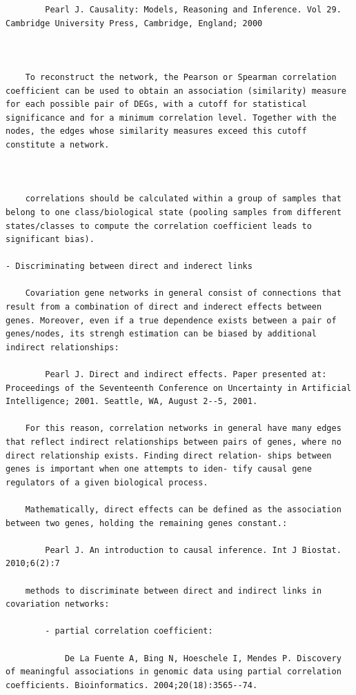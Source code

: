 \documentclass[
]{book}
\begin{document}
\begin{verbatim}
        Pearl J. Causality: Models, Reasoning and Inference. Vol 29. Cambridge University Press, Cambridge, England; 2000



    To reconstruct the network, the Pearson or Spearman correlation coefficient can be used to obtain an association (similarity) measure for each possible pair of DEGs, with a cutoff for statistical significance and for a minimum correlation level. Together with the nodes, the edges whose similarity measures exceed this cutoff constitute a network.



    correlations should be calculated within a group of samples that belong to one class/biological state (pooling samples from different states/classes to compute the correlation coefficient leads to significant bias).

- Discriminating between direct and inderect links

    Covariation gene networks in general consist of connections that result from a combination of direct and inderect effects between genes. Moreover, even if a true dependence exists between a pair of genes/nodes, its strengh estimation can be biased by additional indirect relationships:

        Pearl J. Direct and indirect effects. Paper presented at: Proceedings of the Seventeenth Conference on Uncertainty in Artificial Intelligence; 2001. Seattle, WA, August 2--5, 2001.

    For this reason, correlation networks in general have many edges that reflect indirect relationships between pairs of genes, where no direct relationship exists. Finding direct relation- ships between genes is important when one attempts to iden- tify causal gene regulators of a given biological process.

    Mathematically, direct effects can be defined as the association between two genes, holding the remaining genes constant.:

        Pearl J. An introduction to causal inference. Int J Biostat. 2010;6(2):7

    methods to discriminate between direct and indirect links in covariation networks:

        - partial correlation coefficient:

            De La Fuente A, Bing N, Hoeschele I, Mendes P. Discovery of meaningful associations in genomic data using partial correlation coefficients. Bioinformatics. 2004;20(18):3565--74.


\end{verbatim}
\end{document}
